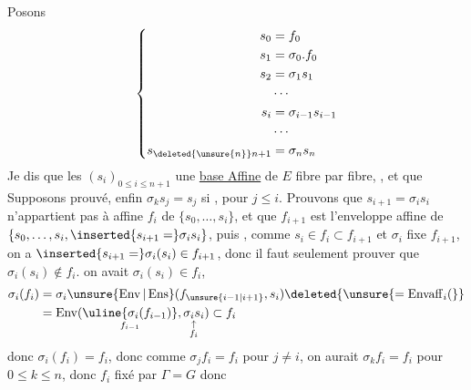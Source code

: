 Posons
\[
\left\{\begin{aligned}
s_0&=f_0\\
s_1&=\sigma_0.f_0\\
s_2&=\sigma_1s_1\\
&\cdots\\
s_i&=\sigma_{i-1}s_{i-1}\\
&\cdots\\
s_{\deleted{\unsure{n}}n+1}&=\sigma_ns_n
\end{aligned}\right.
\]
Je dis que les $(s_i)_{0\leq i\leq n+1}$  une \uline{base Affine} de $E$ fibre par fibre,  , et que  Supposons prouvé,   enfin $\sigma_k s_j=s_j$ si ,  pour $j\leq i$. Prouvons que  $s_{i+1}=\sigma_i s_i$ n'appartient pas à  affine $f_i$ de $\{s_0,\ldots,s_i\}$, et  que $f_{i+1}$ est l'enveloppe affine de $\{s_0,\ldots,s_i,\inserted{s_{i+1}=}\sigma_i s_i\}$,  puis  , comme $s_i\in f_i\subset f_{i+1}$ et $\sigma_i$ fixe $f_{i+1}$, on a $\inserted{s_{i+1}=}\sigma_i(s_i)\in f_{i+1}$, donc il faut seulement prouver que $\sigma_i(s_i)\notin f_i$.  on avait $\sigma_i(s_i)\in f_i$,  
\[
\begin{aligned}
\sigma_i(f_i)&=\sigma_i\unsure{\operatorname{Env}|\operatorname{Ens}}(f_{\unsure{i-1|i+1}},s_i)\deleted{\unsure{=\operatorname{Envaff}_i(}}\\
&=\operatorname{Env}(\underset{f_{i-1}}{\uline{\sigma_i(f_{i-1})}},\underset{\substack{\uparrow\\f_i}}{\sigma_i s_i})\subset f_i
\end{aligned}
\]
donc $\sigma_i(f_i)=f_i$, donc comme $\sigma_j f_i=f_i$ pour $j\neq i$, on aurait $\sigma_k f_i=f_i$ pour $0\leq k\leq n$, donc $f_i$ fixé par $\Gamma=G$ donc

